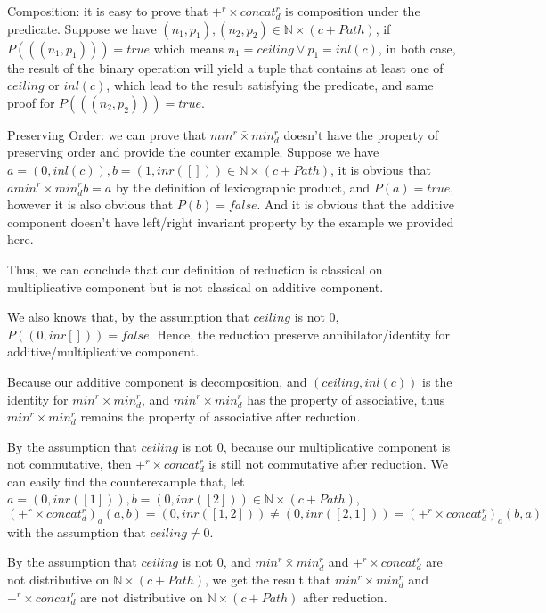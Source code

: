 \documentclass[a4paper,10pt]{article}
\begin{document}
Composition: it is easy to prove that $+^r \times concat^r_d$ is composition under the predicate. Suppose we have $(n_1,p_1),(n_2,p_2) \in \mathbb{N} \times (c + Path)$, if $P(((n_1,p_1))) = true$ which means $n_1 = ceiling \vee p_1 = inl(c)$, in both case, the result of the binary operation will yield a tuple that contains at least one of $ceiling$ or $inl(c)$, which lead to the result satisfying the predicate, and same proof for $P(((n_2,p_2))) = true$.

Preserving Order: we can prove that $min^r \bar{\times} min^r_d$ doesn't have the property of preserving order and provide the counter example. Suppose we have $a = (0,inl (c)), b = (1,inr([])) \in \mathbb{N} \times (c + Path)$, it is obvious that $ a min^r \bar{\times} min^r_d b = a$ by the definition of lexicographic product, and $P(a) = true$, however it is also obvious that $P(b) = false$. And it is obvious that the additive component doesn't have left/right invariant property by the example we provided here.

Thus, we can conclude that our definition of reduction is classical on multiplicative component but is not classical on additive component.

We also knows that, by the assumption that $ceiling$ is not 0, $P((0,inr[])) = false$. Hence, the reduction preserve annihilator/identity for additive/multiplicative component.

Because our additive component is decomposition, and $(ceiling,inl (c))$ is the identity for $min^r \bar{\times} min^r_d$, and $min^r \bar{\times} min^r_d$ has the property of associative, thus $min^r \bar{\times} min^r_d$ remains the property of associative after reduction.

By the assumption that $ceiling$ is not 0, because our multiplicative component is not commutative, then $+^r \times concat^r_d$ is still not commutative after reduction. We can easily find the counterexample that, let $a = (0,inr([1])), b = (0,inr([2])) \in \mathbb{N} \times (c + Path)$, 
\[(+^r \times concat^r_d)_a(a,b) = (0,inr([1,2])) \neq (0,inr([2,1])) = (+^r \times concat^r_d)_a(b,a)\] with the assumption that $ceiling \neq 0$.

By the assumption that $ceiling$ is not 0, and $min^r \bar{\times} min^r_d$ and $+^r \times concat^r_d$ are not distributive on $\mathbb{N} \times (c + Path)$, we get the result that $min^r \bar{\times} min^r_d$ and $+^r \times concat^r_d$ are not distributive on $\mathbb{N} \times (c + Path)$ after reduction.
\end{document}

